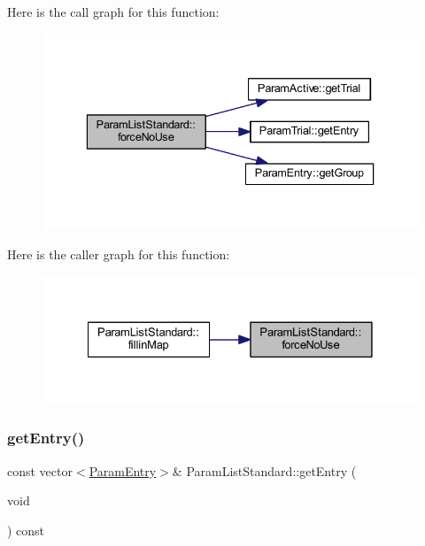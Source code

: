 Here is the call graph for this function\+:
\nopagebreak
\begin{figure}[H]
\begin{center}
\leavevmode
\includegraphics[width=336pt]{class_param_list_standard_a2027e18fbb90231abb775e04cca4ed97_cgraph}
\end{center}
\end{figure}
Here is the caller graph for this function\+:
\nopagebreak
\begin{figure}[H]
\begin{center}
\leavevmode
\includegraphics[width=328pt]{class_param_list_standard_a2027e18fbb90231abb775e04cca4ed97_icgraph}
\end{center}
\end{figure}
\mbox{\label{class_param_list_standard_a2aca7064239033441e64daf86c4de6d0}} 
\subsubsection{\texorpdfstring{getEntry()}{getEntry()}}
{\footnotesize\ttfamily const vector$<$\mbox{\hyperlink{class_param_entry}{Param\+Entry}}$>$\& Param\+List\+Standard\+::get\+Entry (\begin{DoxyParamCaption}\item[{void}]{ }\end{DoxyParamCaption}) const\hspace{0.3cm}{\ttfamily [inline]}}



